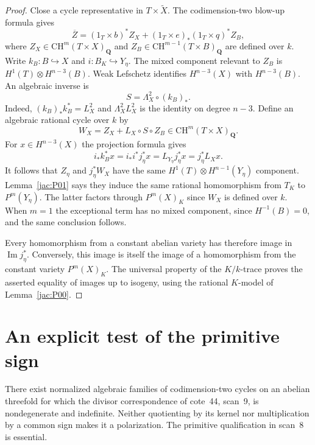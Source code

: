 \begin{proof}
Close a cycle representative in $T\times\widetilde X$.
The codimension-two blow-up formula gives
\[
 \overline Z=(1_T\times b)^*Z_X+
 (1_T\times e)_*(1_T\times q)^*Z_B,
\]
where
$Z_X\in\mathrm{CH}^m(T\times X)_{\mathbf Q}$ and
$Z_B\in\mathrm{CH}^{m-1}(T\times B)_{\mathbf Q}$ are defined over
$k$.  Write $k_B:B\hookrightarrow X$ and $i:B_K\hookrightarrow Y_\eta$.
The mixed component relevant to $Z_B$ is
$H^1(T)\otimes H^{n-3}(B)$.
Weak Lefschetz identifies $H^{n-3}(X)$ with $H^{n-3}(B)$.
An algebraic inverse is
\[
 S=\Lambda_X^2\circ(k_B)_*.
\]
Indeed, $(k_B)_*k_B^*=L_X^2$ and $\Lambda_X^2L_X^2$ is the
identity on degree $n-3$.  Define an algebraic rational cycle over $k$
by
\[
 W_X=Z_X+L_X\circ S\circ Z_B\in
 \mathrm{CH}^m(T\times X)_{\mathbf Q}.
\]
For $x\in H^{n-3}(X)$ the projection formula gives
\[
 i_*k_B^*x=i_*i^*j_\eta^*x=L_{Y_\eta}j_\eta^*x
 =j_\eta^*L_Xx.
\]
It follows that $Z_\eta$ and $j_\eta^*W_X$ have the same
$H^1(T)\otimes H^{n-1}(Y_\eta)$ component.  Lemma~\ref{jac:P01}
says they induce the same rational homomorphism from $T_K$ to
$P^m(Y_\eta)$.  The latter factors through $P^m(X)_K$ since $W_X$
is defined over $k$.  When $m=1$ the exceptional term has no mixed
component, since $H^{-1}(B)=0$, and the same conclusion follows.

Every homomorphism from a constant abelian variety has therefore image
in $\operatorname{Im}j_\eta^*$.  Conversely, this image is itself the
image of a homomorphism from the constant variety $P^m(X)_K$.
The universal property of the $K/k$-trace proves the asserted equality
of images up to isogeny, using the rational $K$-model of
Lemma~\ref{jac:P00}.
\end{proof}

\section{An explicit test of the primitive sign}

\begin{proposition}
\label{jac:P03}
There exist normalized algebraic families of codimension-two cycles
on an abelian threefold for which the divisor correspondence of
cote~44, scan~9, is nondegenerate and indefinite.  Neither quotienting
by its kernel nor multiplication by a common sign makes it a
polarization.  The primitive qualification in scan~8 is essential.
\end{proposition}

